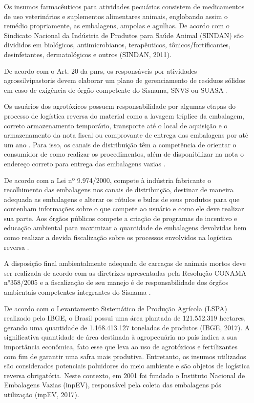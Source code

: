 	Os insumos farmacêuticos para atividades pecuárias consistem de medicamentos de uso veterinários e suplementos alimentares animais, englobando assim o remédio propriamente, as embalagens, ampolas e agulhas. De acordo com o Sindicato Nacional da Indústria de Produtos para Saúde Animal (SINDAN) são divididos em biológicos, antimicrobianos, terapêuticos, tônicos/fortificantes, desinfetantes, dermatológicos e outros (SINDAN, 2011).
	
	De acordo com o Art. 20 da \gls{pnrs}, os responsáveis por atividades agrossilvipastoris devem elaborar um plano de gerenciamento de resíduos sólidos em caso de exigência de órgão competente do Sisnama, SNVS ou SUASA \cite{brasil:12305}.
	
	Os usuários dos agrotóxicos possuem responsabilidade por algumas etapas do processo de logística reversa do material como a lavagem tríplice da embalagem, correto armazenamento temporário, transporte até o local de aquisição e o armazenamento da nota fiscal ou comprovante de entrega das embalagens por até um ano \cite{Brasil9974}. Para isso, os canais de distribuição têm a competência de orientar o consumidor de como realizar os procedimentos, além de disponibilizar na nota o endereço correto para entrega das embalagens vazias \cite{conama:334}.
	
	De acordo com a Lei nº 9.974/2000, compete à indústria fabricante o recolhimento das embalagens nos canais de distribuição, destinar de maneira adequada as embalagens e alterar os rótulos e bulas de seus produtos para que contenham informações sobre o que compete ao usuário e como ele deve realizar sua parte. Aos órgãos públicos compete a criação de programas de incentivo e educação ambiental para maximizar a quantidade de embalagens devolvidas bem como realizar a devida fiscalização sobre os processos envolvidos na logística reversa \cite{Brasil9974}.
	
	A disposição final ambientalmente adequada de carcaças de animais mortos deve ser realizada de acordo com as diretrizes apresentadas pela Resolução CONAMA n°358/2005 e a fiscalização de seu manejo é de responsabilidade dos órgãos ambientais competentes integrantes do Sisnama \cite{brasil:12305}.
	
	De acordo com o Levantamento Sistemático de Produção Agrícola (LSPA) realizado pelo IBGE, o Brasil possui uma área plantada de 121.552.319 hectares, gerando uma quantidade de 1.168.413.127 toneladas de produtos (IBGE, 2017). A significativa quantidade de área destinada à agropecuária no país indica a sua importância econômica, fato esse que leva ao uso de agrotóxicos e fertilizantes com fim de garantir uma safra mais produtiva. Entretanto, os insumos utilizados são considerados potenciais poluidores do meio ambiente e são objetos de logística reversa obrigatória. Neste contexto, em 2001 foi fundado o Instituto Nacional de Embalagens Vazias (inpEV), responsável pela coleta das embalagens pós utilização (inpEV, 2017).
	
